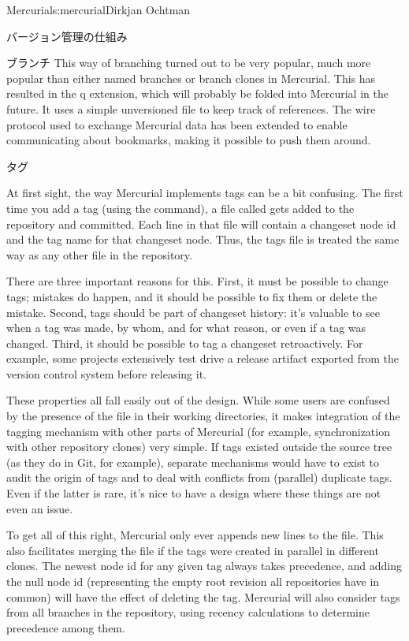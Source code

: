 \begin{aosachapter}{Mercurial}{s:mercurial}{Dirkjan Ochtman}
\begin{aosasect1}{バージョン管理の仕組み}
\begin{aosasect2}{ブランチ}
This way of branching turned out to be very popular, much more popular
than either named branches or branch clones in Mercurial. This has
resulted in the q extension, which will probably be
folded into Mercurial in the future. It uses a simple unversioned file
to keep track of references. The wire protocol used to exchange
Mercurial data has been extended to enable communicating about
bookmarks, making it possible to push them around.

\end{aosasect2}

\begin{aosasect2}{タグ}

At first sight, the way Mercurial implements tags can be a bit
confusing. The first time you add a tag (using the 
command), a file called  gets added to the repository and
committed. Each line in that file will contain a changeset node id and
the tag name for that changeset node. Thus, the tags file is treated
the same way as any other file in the repository.

There are three important reasons for this. First, it must be possible
to change tags; mistakes do happen, and it should be possible to fix
them or delete the mistake. Second, tags should be part of changeset
history: it's valuable to see when a tag was made, by whom, and for
what reason, or even if a tag was changed. Third, it should be
possible to tag a changeset retroactively. For example, some projects
extensively test drive a release artifact exported from the version
control system before releasing it.

These properties all fall easily out of the  design. While some
users are confused by the presence of the  file in their
working directories, it makes integration of the tagging mechanism
with other parts of Mercurial (for example, synchronization with other
repository clones) very simple. If tags existed outside the source
tree (as they do in Git, for example), separate mechanisms would have
to exist to audit the origin of tags and to deal with conflicts from
(parallel) duplicate tags. Even if the latter is rare, it's nice to
have a design where these things are not even an issue.

To get all of this right, Mercurial only ever appends new lines to the
 file. This also facilitates merging the file if the
tags were created in parallel in different clones. The newest node id
for any given tag always takes precedence, and adding the null node id
(representing the empty root revision all repositories have in common)
will have the effect of deleting the tag. Mercurial will also consider
tags from all branches in the repository, using recency calculations
to determine precedence among them.


\end{aosasect2}
\end{aosasect1}
\end{aosachapter}

